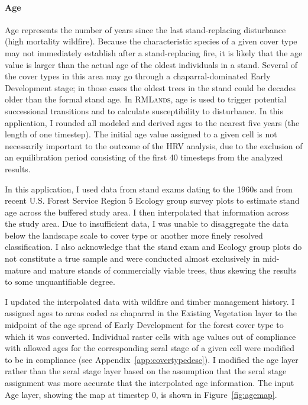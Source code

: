 \paragraph*{Age}
Age represents the number of years since the last stand-replacing disturbance (high mortality wildfire). Because the characteristic species of a given cover type may not immediately establish after a stand-replacing fire, it is likely that the age value is larger than the actual age of the oldest individuals in a stand. Several of the cover types in this area may go through a chaparral-dominated Early Development stage; in those cases the oldest trees in the stand could be decades older than the formal stand age. In \textsc{RMLands}, age is used to trigger potential successional transitions and to calculate susceptibility to disturbance. In this application, I rounded all modeled and derived ages to the nearest five years (the length of one timestep). The initial age value assigned to a given cell is not necessarily important to the outcome of the HRV analysis, due to the exclusion of an equilibration period consisting of the first 40 timesteps from the analyzed results.

In this application, I used data from stand exams dating to the 1960s and from recent U.S. Forest Service Region 5 Ecology group survey plots to estimate stand age across the buffered study area. I then interpolated that information across the study area. Due to insufficient data, I was unable to disaggregate the data below the landscape scale to cover type or another more finely resolved classification. I also acknowledge that the stand exam and Ecology group plots do not constitute a true sample and were conducted almost exclusively in mid-mature and mature stands of commercially viable trees, thus skewing the results to some unquantifiable degree.

I updated the interpolated data with wildfire and timber management history. I assigned ages to areas coded as chaparral in the Existing Vegetation layer to the midpoint of the age spread of Early Development for the forest cover type to which it was converted. Individual raster cells with age values out of compliance with allowed ages for the corresponding seral stage of a given cell were modified to be in compliance (see Appendix~\ref{app:covertypedesc}). I modified the age layer rather than the seral stage layer based on the assumption that the seral stage assignment was more accurate that the interpolated age information. The input Age layer, showing the map at timestep 0, is shown in Figure~\ref{fig:agemap}.



